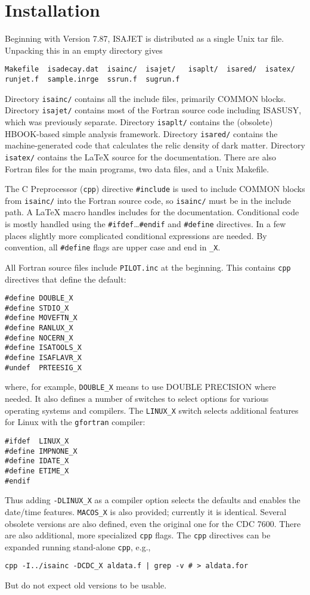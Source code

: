 \newpage
\section{Installation\label{INSTALL}}

      Beginning with Version 7.87, ISAJET is distributed as a single
Unix tar file. Unpacking this in an empty directory gives
\begin{verbatim}
Makefile  isadecay.dat  isainc/  isajet/   isaplt/  isared/  isatex/
runjet.f  sample.inrge  ssrun.f  sugrun.f
\end{verbatim}

Directory \verb|isainc/| contains all the include files, primarily
COMMON blocks. Directory \verb|isajet/| contains most of the Fortran
source code including ISASUSY, which was previously separate. Directory
\verb|isaplt/| contains the (obsolete) HBOOK-based simple analysis
framework. Directory \verb|isared/| contains the machine-generated code
that calculates the relic density of dark matter. Directory
\verb|isatex/| contains the \LaTeX{} source for the documentation. There
are also Fortran files for the main programs, two data files, and a Unix
Makefile.

The C Preprocessor (\verb|cpp|) directive \verb|#include| is used to
include COMMON blocks from \verb|isainc/| into the Fortran source code,
so \verb|isainc/| must be in the include path. A \LaTeX{} macro handles
includes for the documentation. Conditional code is mostly handled using
the \verb|#ifdef|\dots\verb|#endif| and \verb|#define| directives. In a
few places slightly more complicated conditional expressions are needed.
By convention, all \verb|#define| flags are upper case and end in
\verb|_X|.

All Fortran source files include \verb|PILOT.inc| at the beginning. This
contains \verb|cpp| directives that define the default:
\begin{verbatim}
#define DOUBLE_X
#define STDIO_X
#define MOVEFTN_X
#define RANLUX_X
#define NOCERN_X
#define ISATOOLS_X
#define ISAFLAVR_X
#undef  PRTEESIG_X
\end{verbatim}
where, for example, \verb|DOUBLE_X| means to use DOUBLE PRECISION where
needed. It also defines a number of switches to select options for
various operating systems and compilers. The \verb|LINUX_X| switch
selects additional features for Linux with the \verb|gfortran| compiler:
\begin{verbatim}
#ifdef  LINUX_X
#define IMPNONE_X
#define IDATE_X
#define ETIME_X
#endif
\end{verbatim}
Thus adding \verb|-DLINUX_X| as a compiler option selects the defaults
and enables the date/time features. \verb|MACOS_X| is also provided;
currently it is identical. Several obsolete versions are also defined,
even the original one for the CDC 7600. There are also additional, more
specialized \verb|cpp| flags. The \verb|cpp| directives can be expanded 
running stand-alone \verb|cpp|, e.g.,
\begin{verbatim}
cpp -I../isainc -DCDC_X aldata.f | grep -v # > aldata.for
\end{verbatim}
But do not expect old versions to be usable.

